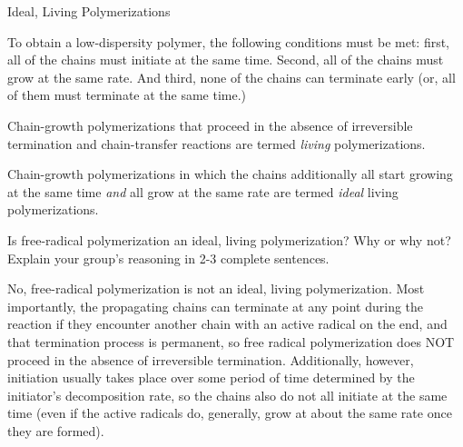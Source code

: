 \begin{activity}{Ideal, Living Polymerizations}
\begin{ctqs}
		\begin{solution}[2in]
			To obtain a low-dispersity polymer, the following conditions must be met: first, all of the chains must initiate at the same time.  Second, all of the chains must grow at the same rate.  And third, none of the chains can terminate early (or, all of them must terminate at the same time.)
		\end{solution}

\end{ctqs}

\begin{infobox}

	Chain-growth polymerizations that proceed in the absence of irreversible termination and chain-transfer reactions are termed \emph{living} polymerizations.
	
	Chain-growth polymerizations in which the chains additionally all start growing at the same time \emph{and} all grow at the same rate are termed \emph{ideal} living polymerizations.

\end{infobox}

\begin{ctqs}

	\question Is free-radical polymerization an ideal, living polymerization?  Why or why not?  Explain your group's reasoning in 2-3 complete sentences.
	
		\begin{solution}[2in]
			No, free-radical polymerization is not an ideal, living polymerization.  Most importantly, the propagating chains can terminate at any point during the reaction if they encounter another chain with an active radical on the end, and that termination process is permanent, so free radical polymerization does NOT proceed in the absence of irreversible termination.  Additionally, however, initiation usually takes place over some period of time determined by the initiator's decomposition rate, so the chains also do not all initiate at the same time (even if the active radicals do, generally, grow at about the same rate once they are formed).
		\end{solution}

\end{ctqs}

\begin{model}
	\label{\labelbase:mdl:poisson}


\end{model}
\end{activity}
